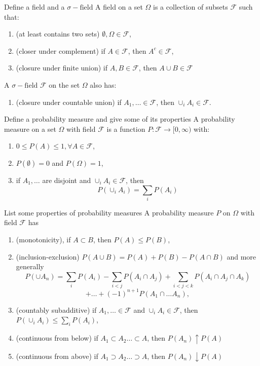 \documentclass[avery5388,grid,frame]{flashcards}
\newcommand{\sigf}{\sigma-\text{field}}
\newcommand{\F}{\mathcal F}
\begin{document}


\begin{flashcard}
    {Define a field and a $\sigf$}
    A field on a set $\Omega$ is a collection of subsets $\F$ such that:
    \begin{enumerate}
        \item (at least contains two sets) $\emptyset, \Omega \in \F$,
        \item (closer under complement) if $A \in \F$, then $A^c \in \F$,
        \item (closure under finite union) if $A, B \in \F$, then $A \cup B \in \F$
    \end{enumerate}

    A $\sigf$ $\F$ on the set $\Omega$ also has:
    \begin{enumerate}[resume]
        \item (closure under countable union) if $A_1, \dots \in \F$, then $\cup_i A_i \in \F$.
    \end{enumerate}
\end{flashcard}


\begin{flashcard}
    {Define a probability measure and give some of its properties}
    A probability measure on a set $\Omega$ with field $\F$ is a function $P: \F \rightarrow [0, \infty)$ with:
    \begin{enumerate}
        \item $0 \leq P(A) \leq 1, \forall A \in \F$,
        \item $P(\emptyset) = 0$ and $P(\Omega) = 1$,
        \item if $A_1, \dots$ are disjoint and $\cup_i A_i \in \F$, then
        $$P(\cup_i A_i) = \sum_i P(A_i)$$
    \end{enumerate}
\end{flashcard}


\begin{flashcard}
    {List some properties of probability measures}
    A probability measure $P$ on $\Omega$ with field $\F$ has
    \begin{enumerate}
        \item (monotonicity), if $A \subset B$, then $P(A) \leq P(B)$,
        \item (inclusion-exclusion) $P(A \cup B) = P(A) + P(B) - P(A \cap B)$ and more generally
        $$P(\cup A_n) = \sum_i P(A_i) - \sum_{i < j} P(A_i \cap A_j) + \sum_{i < j < k} P(A_i \cap A_j \cap A_k)$$
        $$+ \dots + (-1)^{n+1} P(A_1 \cap \dots A_n),$$
        \item (countably subadditive) if $A_1, \dots \in \F$ and $\cup_i A_i \in \F$, then $P(\cup_i A_i) \leq \sum_i P(A_i)$,
        \item (continuous from below) if $A_1 \subset A_2 \dots \subset A$, then $P(A_n) \uparrow P(A)$
        \item (continuous from above) if $A_1 \supset A_2 \dots \supset A$, then $P(A_n) \downarrow P(A)$
    \end{enumerate}
\end{flashcard}
\end{document}
